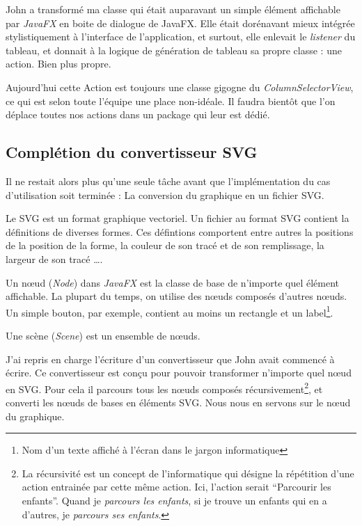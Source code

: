 John a transformé ma classe qui était auparavant un simple élément affichable par \textit{JavaFX} en boite de dialogue de JavaFX. Elle était dorénavant mieux intégrée stylistiquement à l'interface de l'application, et surtout, elle enlevait le \textit{listener} du tableau, et donnait à la logique de génération de tableau sa propre classe : une action. Bien plus propre.

Aujourd'hui cette Action est toujours une classe gigogne du \textit{ColumnSelectorView}, ce qui est selon toute l'équipe une place non-idéale. Il faudra bientôt que l'on déplace toutes nos actions dans un package qui leur est dédié.

%
%
\subsection{Complétion du convertisseur SVG}
Il ne restait alors plus qu'une seule tâche avant que l'implémentation du cas d'utilisation soit terminée : La conversion du graphique en un fichier SVG.

\begin{center}
Le SVG est un format graphique vectoriel. Un fichier au format SVG contient la définitions de diverses formes. Ces défintions comportent entre autres la positions de la position de la forme, la couleur de son tracé et de son remplissage, la largeur de son tracé \ldots.
\end{center}

\begin{center}
Un nœud (\textit{Node}) dans \textit{JavaFX} est la classe de base de n'importe quel élément affichable. La plupart du temps, on utilise des nœuds composés d'autres nœuds. Un simple bouton, par exemple, contient au moins un rectangle et un label\footnote{Nom d'un texte affiché à l'écran dans le jargon informatique}.
\end{center}

\begin{center}
Une scène (\textit{Scene}) est un ensemble de nœuds.
\end{center}

J'ai repris en charge l'écriture d'un convertisseur que John avait commencé à écrire. Ce convertisseur est conçu pour pouvoir transformer n'importe quel nœud en SVG. Pour cela il parcours tous les nœuds composés récursivement\footnote{La récursivité est un concept de l'informatique qui désigne la répétition d'une action entrainée par cette même action. Ici, l'action serait ``Parcourir les enfants''. Quand je \emph{parcours les enfants}, si je trouve un enfants qui en a d'autres, je \emph{parcours ses enfants}.}, et converti les nœuds de bases en éléments SVG. Nous nous en servons sur le nœud du graphique.

